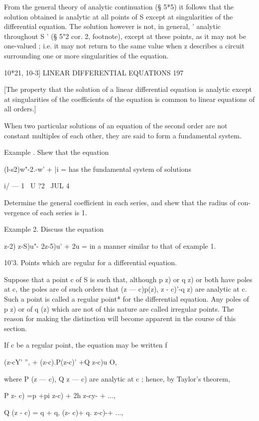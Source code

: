 From the general theory of analytic continuation (§ 5*5) it follows that 
the solution obtained is analytic at all points of S except at singularities 
of the differential equation. The solution however is not, in general, 
' analytic throughout S ' (§ 5"2 cor. 2, footnote), except at these points, as it 
may not be one-valued ; i.e. it may not return to the same value when z 
describes a circuit surrounding one or more singularities of the equation. 



10*21, 10-3] LINEAR DIFFERENTIAL EQUATIONS 197 

[The property that the solution of a linear differential equation is analytic 
except at singularities of the coefficients of the equation is common to linear 
equations of all orders.] 

When two particular solutions of an equation of the second order are not 
constant multiples of each other, they are said to form a fundamental system. 

Example .  Shew that the equation 

(l-s2)w"-2.-w' + |i  = 
has the fundamental system of solutions 

i/ — 1 \  U ?2 \  JUL  4 \  

Determine the general coefficient in each series, and shew that the radius of con- 
vergence of each series is 1. 

Example 2. Discuss the equation 

 z-2) z-S)u"- 2z-5)u' + 2u = 
in a manner similar to that of example 1. 

10'3. Points which are regular for a differential equation. 

Suppose that a point c of S is such that, although p  z) or q  z) or both 
have poles at c, the poles are of such orders that (z — c)p(z),  z - c)'-q z) are 
analytic at c. Such a point is called a regular point* for the differential 
equation. Any poles of p z) or of q (z) which are not of this nature are called 
irregular points. The reason for making the distinction will become apparent 
in the course of this section. 

If c be a regular point, the equation may be written f 

(z-cY' '', + (z-c).P(z-c)' +Q z-c)u O, 

where P (z — c), Q  z — c) are analytic at c ; hence, by Taylor's theorem, 

P z- c) =p +pi z-c) + 2h  z-cy- + ..., 

Q (z - c) = q  + q, (z- c)+ q.  z-c)-+ ..., 

